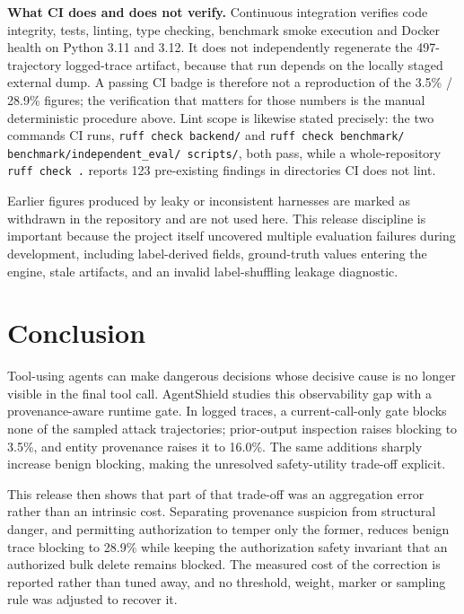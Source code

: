 \documentclass[letterpaper,twocolumn,10pt]{article}
\begin{document}
\noindent\textbf{What CI does and does not verify.} Continuous integration
verifies code integrity, tests, linting, type checking, benchmark smoke
execution and Docker health on Python 3.11 and 3.12. It does not independently
regenerate the 497-trajectory logged-trace artifact, because that run depends
on the locally staged external dump. A passing CI badge is therefore not a
reproduction of the 3.5\% / 28.9\% figures; the verification that matters for
those numbers is the manual deterministic procedure above. Lint scope is
likewise stated precisely: the two commands CI runs, \texttt{ruff check
backend/} and \texttt{ruff check benchmark/}
\texttt{benchmark/independent\_eval/ scripts/}, both pass, while a
whole-repository \texttt{ruff check .} reports 123 pre-existing findings in
directories CI does not lint.

Earlier figures produced by leaky or inconsistent harnesses are marked as
withdrawn in the repository and are not used here. This release discipline is
important because the project itself uncovered multiple evaluation failures
during development, including label-derived fields, ground-truth values entering
the engine, stale artifacts, and an invalid label-shuffling leakage diagnostic.

\section{Conclusion}
\label{sec:conclusion}

Tool-using agents can make dangerous decisions whose decisive cause is no longer
visible in the final tool call. AgentShield studies this observability gap with
a provenance-aware runtime gate. In logged traces, a current-call-only gate
blocks none of the sampled attack trajectories; prior-output inspection raises
blocking to 3.5\%, and entity provenance raises it to 16.0\%. The same additions
sharply increase benign blocking, making the unresolved safety-utility trade-off
explicit.

This release then shows that part of that trade-off was an aggregation error
rather than an intrinsic cost. Separating provenance suspicion from structural
danger, and permitting authorization to temper only the former, reduces benign
trace blocking to 28.9\% while keeping the authorization safety invariant that
an authorized bulk delete remains blocked. The measured cost of the correction
is reported rather than tuned away, and no threshold, weight, marker or sampling
rule was adjusted to recover it.
\end{document}
